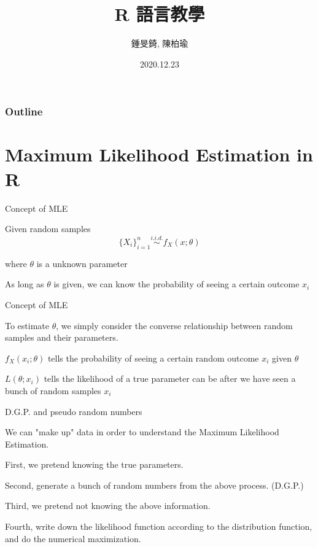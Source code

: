 \documentclass[12pt]{beamer}
\title{R 語言教學}
\author{鍾旻錡, 陳柏瑜}
\institute[NTU Econ]{\scshape Statistics with Recitation  \\ NTU Econ}
\date{2020.12.23}
\begin{document}
\begin{frame}
\titlepage
\end{frame}

\begin{frame}
\frametitle{Outline}
\tableofcontents
\end{frame}


\section{Maximum Likelihood Estimation in R} 

\begin{frame}[fragile]{Concept of MLE}

Given random samples 
$$\{X_i\}_{i=1}^n \stackrel{i.i.d.}{\sim} f_X(x; \theta)$$

where $\theta$ is a unknown parameter

As long as $\theta$ is given, we can know the probability of seeing a certain outcome $x_i$


\end{frame}


\begin{frame}[fragile]{Concept of MLE}

To estimate $\theta$, we simply consider the converse relationship between random samples and their parameters.


$f_X(x_i; \theta)$ tells the probability of seeing a certain random outcome $x_i$ given $\theta$

$L(\theta ; x_i)$ tells the likelihood of a true parameter can be after we have seen a bunch of random samples $x_i$

\end{frame}


\begin{frame}[fragile]{D.G.P. and pseudo random numbers}

We can "make up" data in order to understand the Maximum Likelihood Estimation.

First, we pretend knowing the true parameters.

Second, generate a bunch of random numbers from the above process. (D.G.P.)

Third, we pretend not knowing the above information.

Fourth, write down the likelihood function according to the distribution function, and do the numerical maximization.

\end{frame}
\end{document}
